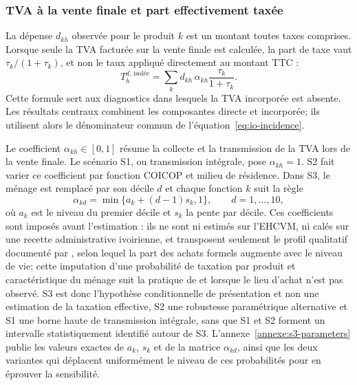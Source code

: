 \documentclass[11pt,a4paper]{article}
\begin{document}
\subsubsection{TVA à la vente finale et part effectivement taxée}
\label{sec:tva-directe}

La dépense $d_{kh}$ observée pour le produit $k$ est un montant toutes taxes
comprises. Lorsque seule la TVA facturée sur la vente finale est calculée, la
part de taxe vaut $\tau_k/(1+\tau_k)$, et non le taux appliqué directement au
montant TTC :
\begin{equation}
T_h^{d,\,\text{isolée}}=\sum_k d_{kh}\,\alpha_{kh}
\frac{\tau_k}{1+\tau_k}.
\label{eq:vat-direct}
\end{equation}
Cette formule sert aux diagnostics dans lesquels la TVA incorporée est absente.
Les résultats centraux combinent les composantes directe et incorporée; ils
utilisent alors le dénominateur commun de l'équation~\eqref{eq:io-incidence}.

Le coefficient $\alpha_{kh}\in[0,1]$ résume la collecte et la transmission de la
TVA lors de la vente finale. Le scénario S1, ou transmission intégrale, pose
$\alpha_{kh}=1$. S2 fait
varier ce coefficient par fonction COICOP et milieu de résidence. Dans S3, le
ménage est remplacé par son décile $d$ et chaque fonction $k$ suit la règle
\begin{equation}
\alpha_{kd}=\min\{a_k+(d-1)s_k,1\},\qquad d=1,\ldots,10,
\label{eq:alpha-s3}
\end{equation}
où $a_k$ est le niveau du premier décile et $s_k$ la pente par décile. Ces
coefficients sont imposés avant l'estimation : ils ne sont ni estimés sur
l'EHCVM, ni calés sur une recette administrative ivoirienne, et transposent
seulement le profil qualitatif documenté par \citet{bachas2024}, selon lequel la
part des achats formels augmente avec le niveau de vie; cette imputation d'une
probabilité de taxation par produit et caractéristique du ménage suit la
pratique de \citet{warwick2022} et \citet{harris2018} lorsque le lieu d'achat
n'est pas observé. S3 est donc l'hypothèse
conditionnelle de présentation et non une estimation de la taxation effective,
S2 une robustesse paramétrique alternative et S1 une borne haute de transmission
intégrale, sans que S1 et S2 forment un intervalle statistiquement identifié
autour de S3. L'annexe~\ref{annexe:s3-parameters} publie les valeurs exactes de
$a_k$, $s_k$ et de la matrice $\alpha_{kd}$, ainsi que les deux variantes qui
déplacent uniformément le niveau de ces probabilités pour en éprouver la
sensibilité.
\end{document}

